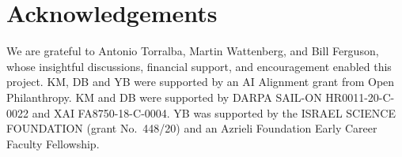 {\small
\section*{Acknowledgements}

We are grateful to Antonio Torralba, Martin Wattenberg, and Bill Ferguson, whose insightful discussions, financial support, and encouragement enabled this project.  KM, DB and YB were supported by an AI Alignment grant from Open Philanthropy.  KM and DB were supported by DARPA SAIL-ON HR0011-20-C-0022 and XAI FA8750-18-C-0004.  YB was supported by the ISRAEL SCIENCE FOUNDATION (grant No.\ 448/20) and an Azrieli Foundation Early Career Faculty Fellowship.
}
